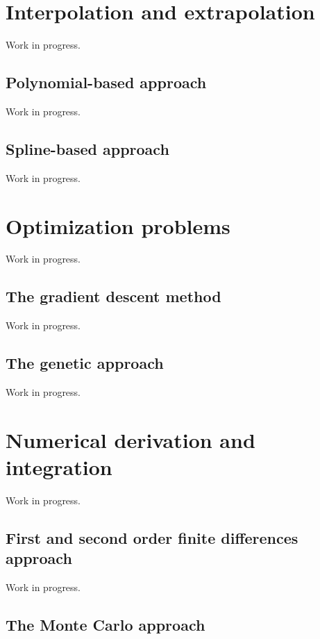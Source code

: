 \documentclass{book}
\begin{document}
\section{Interpolation and extrapolation}

Work in progress.

\subsection{Polynomial-based approach}

Work in progress.

\subsection{Spline-based approach}

Work in progress.

\section{Optimization problems}

Work in progress.

\subsection{The gradient descent method}

Work in progress.

\subsection{The genetic approach}

Work in progress.

\section{Numerical derivation and integration}

Work in progress.

\subsection{First and second order finite differences approach}

Work in progress.

\subsection{The Monte Carlo approach}
\end{document}
